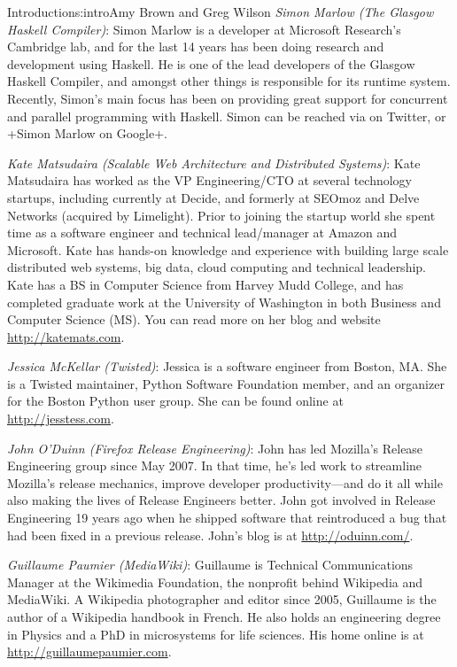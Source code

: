 \begin{aosachapter}{Introduction}{s:intro}{Amy Brown and Greg Wilson}
\emph{Simon Marlow (The Glasgow Haskell Compiler)}: Simon Marlow is a developer
at Microsoft Research's Cambridge lab, and for the last 14 years has been doing
research and development using Haskell.  He is one of the lead developers of
the Glasgow Haskell Compiler, and amongst other things is responsible for its
runtime system.  Recently, Simon's main focus has been on providing great
support for concurrent and parallel programming with Haskell.  Simon can be
reached via  on Twitter, or +Simon Marlow on Google+.

\emph{Kate Matsudaira (Scalable Web Architecture and Distributed Systems)}:
Kate Matsudaira has worked as the VP Engineering/CTO at several technology
startups, including currently at Decide, and formerly at SEOmoz and
Delve Networks (acquired by Limelight).  Prior to joining the startup world she
spent time as a software engineer and technical lead/manager at Amazon and
Microsoft. Kate has hands-on knowledge and experience with building large scale
distributed web systems, big data, cloud computing and technical leadership.
Kate has a BS in Computer Science from Harvey Mudd College, and has completed
graduate work at the University of Washington in both Business and Computer
Science (MS).  You can read more on her blog and website
\url{http://katemats.com}. 

\emph{Jessica McKellar (Twisted)}: Jessica is a software engineer from Boston, MA. She is a Twisted
maintainer, Python Software Foundation member, and an organizer for
the Boston Python user group. She can be found online at
\url{http://jesstess.com}.

\emph{John O'Duinn (Firefox Release Engineering)}: John has led Mozilla's
Release Engineering group since May 2007. In that time, he's led work to
streamline Mozilla's release mechanics, improve developer productivity---and do
it all while also making the lives of Release Engineers better. John got
involved in Release Engineering 19 years ago when he shipped software that
reintroduced a bug that had been fixed in a previous release. John's blog is at
\url{http://oduinn.com/}.

\emph{Guillaume Paumier (MediaWiki)}: Guillaume is Technical Communications
Manager at the Wikimedia Foundation, the nonprofit  behind Wikipedia
and MediaWiki. A Wikipedia photographer and editor since 2005, Guillaume
is the author of a Wikipedia handbook in French. He also holds an engineering
degree in Physics and a PhD in microsystems for life sciences. His home online
is at \url{http://guillaumepaumier.com}.


\end{aosachapter}
